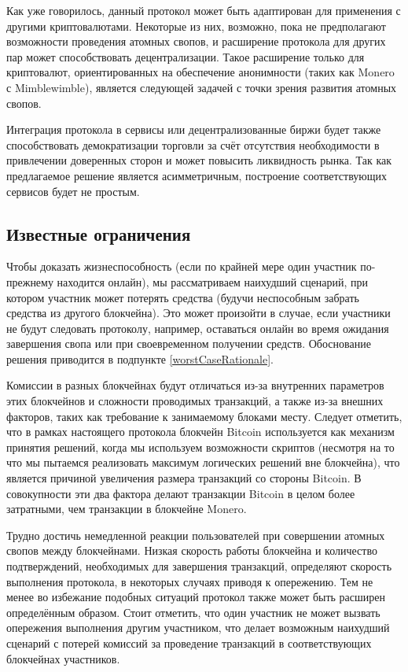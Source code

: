 \documentclass{llncs}
\begin{document}
Как уже говорилось, данный протокол может быть адаптирован для применения с другими криптовалютами. Некоторые из них, возможно, пока не предполагают возможности проведения атомных свопов, и расширение протокола для других пар может способствовать децентрализации. Такое расширение только для криптовалют, ориентированных на обеспечение анонимности (таких как Monero с  Mimblewimble), является следующей задачей с точки зрения развития атомных свопов.

Интеграция протокола в сервисы или децентрализованные биржи будет также способствовать демократизации торговли за счёт отсутствия необходимости в привлечении доверенных сторон и может повысить ликвидность рынка. Так как предлагаемое решение является асимметричным, построение соответствующих сервисов будет не простым.

\subsection{Известные ограничения}
Чтобы доказать жизнеспособность (если по крайней мере один участник по-прежнему находится онлайн), мы рассматриваем наихудший сценарий, при котором участник может потерять средства (будучи неспособным забрать средства из другого блокчейна). Это может произойти в случае, если участники не будут следовать протоколу, например, оставаться онлайн во время ожидания завершения свопа или при своевременном получении средств. Обоснование решения приводится в подпункте \ref{worstCaseRationale}.

Комиссии в разных блокчейнах будут отличаться из-за внутренних параметров этих блокчейнов и сложности проводимых транзакций, а также из-за внешних факторов, таких как требование к занимаемому блоками месту. Следует отметить, что в рамках настоящего протокола блокчейн Bitcoin используется как механизм принятия решений, когда мы используем возможности скриптов (несмотря на то что мы пытаемся реализовать максимум логических решений вне блокчейна), что является причиной увеличения размера транзакций со стороны Bitcoin. В совокупности эти два фактора делают транзакции Bitcoin в целом более затратными, чем транзакции в блокчейне Monero.

Трудно достичь немедленной реакции пользователей при совершении атомных свопов между блокчейнами. Низкая скорость работы блокчейна и количество подтверждений, необходимых для завершения транзакций, определяют скорость выполнения протокола, в некоторых случаях приводя к опережению. Тем не менее во избежание подобных ситуаций протокол также может быть расширен определённым образом. Стоит отметить, что один участник не может вызвать опережения выполнения другим участником, что делает возможным наихудший сценарий с потерей комиссий за проведение транзакций в соответствующих блокчейнах участников.
\end{document}
